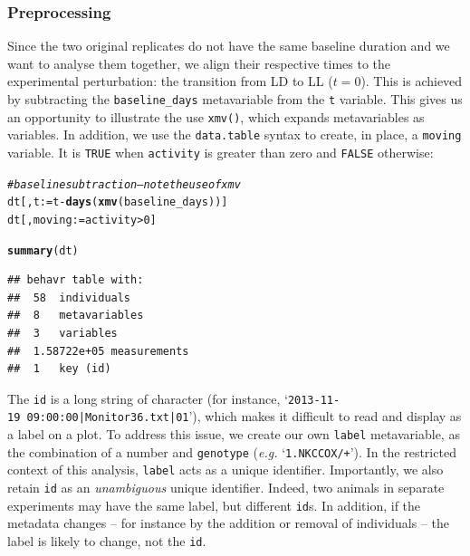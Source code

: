 \documentclass[10pt,letterpaper]{article}\usepackage[]{graphicx}\usepackage[]{color}
\makeatletter
\newcommand{\hlnum}[1]{\textcolor[rgb]{0.686,0.059,0.569}{#1}}%
\newcommand{\hlcom}[1]{\textcolor[rgb]{0.678,0.584,0.686}{\textit{#1}}}%
\newcommand{\hlopt}[1]{\textcolor[rgb]{0,0,0}{#1}}%
\newcommand{\hlstd}[1]{\textcolor[rgb]{0.345,0.345,0.345}{#1}}%
\newcommand{\hlkwb}[1]{\textcolor[rgb]{0.69,0.353,0.396}{#1}}%
\newcommand{\hlkwd}[1]{\textcolor[rgb]{0.737,0.353,0.396}{\textbf{#1}}}%
\newenvironment{kframe}{%
 \def\at@end@of@kframe{}%
 \ifinner\ifhmode%
  \def\at@end@of@kframe{\end{minipage}}%
  \begin{minipage}{\columnwidth}%
 \fi\fi%
 \def\FrameCommand##1{\hskip\@totalleftmargin \hskip-\fboxsep
 \colorbox{shadecolor}{##1}\hskip-\fboxsep
     \hskip-\linewidth \hskip-\@totalleftmargin \hskip\columnwidth}%
 \MakeFramed {\advance\hsize-\width
   \@totalleftmargin\z@ \linewidth\hsize
   \@setminipage}}%
 {\par\unskip\endMakeFramed%
 \at@end@of@kframe}
\newenvironment{knitrout}{}{} %
\makeatother
\begin{document}
\subsubsection*{Preprocessing}
Since the two original replicates do not have the same baseline duration and we want to analyse them together,
we align their respective times to the experimental perturbation: the transition from LD to LL ($t = 0$). 
This is achieved by subtracting the \texttt{baseline\_days} metavariable from the \texttt{t} variable.
This gives us an opportunity to illustrate the use \texttt{xmv()}, which expands metavariables as variables.
In addition, we use the \texttt{data.table} syntax to create, in place, a \texttt{moving} variable.
It is \texttt{TRUE} when \texttt{activity} is greater than zero and \texttt{FALSE} otherwise:

\begin{knitrout}
\color{fgcolor}\begin{kframe}
\begin{alltt}
\hlcom{# baseline subtraction -- note the use of xmv}
\hlstd{dt[,t} \hlkwb{:=} \hlstd{t} \hlopt{-} \hlkwd{days}\hlstd{(}\hlkwd{xmv}\hlstd{(baseline_days))]}
\hlstd{dt[, moving} \hlkwb{:=}  \hlstd{activity} \hlopt{>} \hlnum{0}\hlstd{]}
\end{alltt}
\end{kframe}
\end{knitrout}

\begin{knitrout}
\color{fgcolor}\begin{kframe}
\begin{alltt}
\hlkwd{summary}\hlstd{(dt)}
\end{alltt}
\begin{verbatim}
## behavr table with:
##  58	individuals
##  8	metavariables
##  3	variables
##  1.58722e+05	measurements
##  1	key (id)
\end{verbatim}
\end{kframe}
\end{knitrout}

The \texttt{id} is a long string of character (for instance, `\texttt{2013-11-19~09:00:00|Monitor36.txt|01}'), 
which makes it difficult to read and display as a label on a plot.
To address this issue, we create our own \texttt{label} metavariable, as the combination of a number and \texttt{genotype} (\emph{e.g.} `\texttt{1.NKCCOX/+}').
In the restricted context of this analysis, \texttt{label} acts as a unique identifier.
Importantly, we also retain \texttt{id} as an \emph{unambiguous} unique identifier.
Indeed, two animals in separate experiments may have the same label, but different \texttt{id}s.
In addition, if the metadata changes -- for instance by the addition or removal of individuals -- the label is likely to change, not the \texttt{id}.
\end{document}
